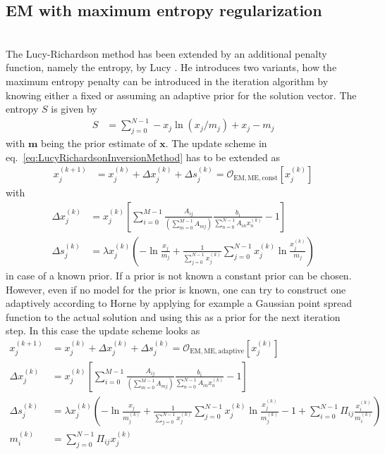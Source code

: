 \subsection{EM with maximum entropy regularization}~\\
The Lucy\hyp{}Richardson method \cite{Richardson1972,Lucy1974} has been extended by an additional penalty function,
namely the entropy, by Lucy \cite{Lucy1994}. He introduces two variants, how the maximum entropy penalty can be introduced in the iteration algorithm by knowing either a fixed or assuming an adaptive prior for the solution vector. The entropy $S$ is given by
\begin{align}
S&= \sum_{j=0}^{N-1} -x_j\ln\left(x_j/m_j\right) +x_j-m_j \label{eq:EMentropy}
\end{align}
with $\mathbf{m}$ being the prior estimate of $\mathbf{x}$. The update scheme in eq.\ \ref{eq:LucyRichardsonInversionMethod} has to be extended as
\begin{align}
\label{eq:LucyRichardsonInversionMethodMEconstant}
  x_j^{(k+1)} &= x_j^{(k)} + \Delta x_j^{(k)} + \Delta s_j^{(k)}= \mathcal{O}_\mathrm{EM,ME,const}\left[x_j^{(k)}\right]
\end{align}
with
\begin{align}
  \Delta x_j^{(k)} &= x_j^{(k)}\left[\sum_{i=0}^{M-1}\frac{A_{ij}}{\left(\displaystyle \sum_{m=0}^{M-1}A_{mj}\right)}\frac{b_i}{\displaystyle \sum_{n=0}^{N-1}A_{in}x_n^{(k)}}-1\right] \\
  \Delta s_j^{(k)} &=  \lambda x_j^{(k)}\left(-\ln\frac{x_j}{m_j}+\frac{1}{\sum_{j=0}^{N-1}x_j^{(k)}}\sum_{j=0}^{N-1}x_j^{(k)}\ln\frac{x_j^{(k)}}{m_j}\right)
\end{align}
in case of a known prior. If a prior is not known a constant prior can be chosen. However, even if no model for the prior is known, one can try to construct one adaptively according to Horne \cite{Horne1985} by applying for example a Gaussian point spread function to the actual solution and using this as a prior for the next iteration step. In this case the update scheme looks as
\begin{align}
\label{eq:LucyRichardsonInversionMethodMEadaptive}
  x_j^{(k+1)} &= x_j^{(k)} + \Delta x_j^{(k)} + \Delta s_j^{(k)}= \mathcal{O}_\mathrm{EM,ME,adaptive}\left[x_j^{(k)}\right]\\
  \Delta x_j^{(k)} &= x_j^{(k)}\left[\sum_{i=0}^{M-1}\frac{A_{ij}}{\left( \sum_{m=0}^{M-1}A_{mj}\right)}\frac{b_i}{ \sum_{n=0}^{N-1}A_{in}x_n^{(k)}}-1\right] \\
  \Delta s_j^{(k)} &=  \lambda x_j^{(k)}\left(-\ln\frac{x_j}{m_j^{(k)}}
                                +\frac{1}{\sum_{j=0}^{N-1}x_j^{(k)}}\sum_{j=0}^{N-1}x_j^{(k)}\ln\frac{x_j^{(k)}}{m_j^{(k)}}
                                -1+\sum_{i=0}^{N-1}\Pi_{ij}\frac{x_i^{(k)}}{m_i^{(k)}}\right) \\
  m_i^{(k)} &= \sum_{j=0}^{N-1}\Pi_{ij}x_j^{(k)}
\end{align}
